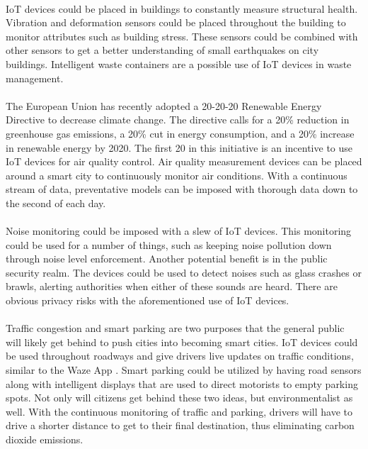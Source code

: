 \documentclass[a4paper,12pt]{article}
\begin{document}
\paragraph{}
IoT devices could be placed in buildings to constantly measure structural health. Vibration and deformation sensors could be placed throughout the building to monitor attributes such as building stress. These sensors could be combined with other sensors to get a better understanding of small earthquakes on city buildings. Intelligent waste containers are a possible use of IoT devices in waste management. 
\paragraph{}
The European Union has recently adopted a 20-20-20 Renewable Energy Directive to decrease climate change. The directive calls for a 20\% reduction in greenhouse gas emissions, a 20\% cut in energy consumption, and a 20\% increase in renewable energy by 2020. The first 20 in this initiative is an incentive to use IoT devices for air quality control. Air quality measurement devices can be placed around a smart city to continuously monitor air conditions. With a continuous stream of data, preventative models can be imposed with thorough data down to the second of each day. 
\paragraph{}
Noise monitoring could be imposed with a slew of IoT devices. This monitoring could be used for a number of things, such as keeping noise pollution down through noise level enforcement. Another potential benefit is in the public security realm. The devices could be used to detect noises such as glass crashes or brawls, alerting authorities when either of these sounds are heard. There are obvious privacy risks with the aforementioned use of IoT devices. 
\paragraph{}
Traffic congestion and smart parking are two purposes that the general public will likely get behind to push cities into becoming smart cities. IoT devices could be used throughout roadways and give drivers live updates on traffic conditions, similar to the Waze App \cite{waze}. Smart parking could be utilized by having road sensors along with intelligent displays that are used to direct motorists to empty parking spots. Not only will citizens get behind these two ideas, but environmentalist as well. With the continuous monitoring of traffic and parking, drivers will have to drive a shorter distance to get to their final destination, thus eliminating carbon dioxide emissions.
\end{document}

